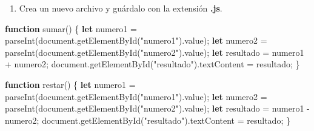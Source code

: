 \documentclass[
  a4paper,
  DIV=11,
  numbers=noendperiod,
  onepage,
  openany]{scrreprt}
\newenvironment{Shaded}{\begin{snugshade}}{\end{snugshade}}
\newcommand{\AttributeTok}[1]{\textcolor[rgb]{0.40,0.45,0.13}{#1}}
\newcommand{\BuiltInTok}[1]{\textcolor[rgb]{0.00,0.23,0.31}{#1}}
\newcommand{\FunctionTok}[1]{\textcolor[rgb]{0.28,0.35,0.67}{#1}}
\newcommand{\KeywordTok}[1]{\textcolor[rgb]{0.00,0.23,0.31}{\textbf{#1}}}
\newcommand{\NormalTok}[1]{\textcolor[rgb]{0.00,0.23,0.31}{#1}}
\newcommand{\OperatorTok}[1]{\textcolor[rgb]{0.37,0.37,0.37}{#1}}
\newcommand{\PreprocessorTok}[1]{\textcolor[rgb]{0.68,0.00,0.00}{#1}}
\newcommand{\StringTok}[1]{\textcolor[rgb]{0.13,0.47,0.30}{#1}}
\providecommand{\tightlist}{%
  \setlength{\itemsep}{0pt}\setlength{\parskip}{0pt}}\usepackage{longtable,booktabs,array}
\begin{document}
\begin{tcolorbox}
\begin{enumerate}
\def\labelenumi{\arabic{enumi}.}
\setcounter{enumi}{3}
\tightlist
\item
  Crea un nuevo archivo y guárdalo con la extensión \textbf{.js}.
\end{enumerate}

\begin{Shaded}
\begin{Highlighting}[]
\KeywordTok{function} \FunctionTok{sumar}\NormalTok{() \{}
    \KeywordTok{let}\NormalTok{ numero1 }\OperatorTok{=} \PreprocessorTok{parseInt}\NormalTok{(}\BuiltInTok{document}\OperatorTok{.}\FunctionTok{getElementById}\NormalTok{(}\StringTok{"numero1"}\NormalTok{)}\OperatorTok{.}\AttributeTok{value}\NormalTok{)}\OperatorTok{;}
    \KeywordTok{let}\NormalTok{ numero2 }\OperatorTok{=} \PreprocessorTok{parseInt}\NormalTok{(}\BuiltInTok{document}\OperatorTok{.}\FunctionTok{getElementById}\NormalTok{(}\StringTok{"numero2"}\NormalTok{)}\OperatorTok{.}\AttributeTok{value}\NormalTok{)}\OperatorTok{;}
    \KeywordTok{let}\NormalTok{ resultado }\OperatorTok{=}\NormalTok{ numero1 }\OperatorTok{+}\NormalTok{ numero2}\OperatorTok{;}
    \BuiltInTok{document}\OperatorTok{.}\FunctionTok{getElementById}\NormalTok{(}\StringTok{"resultado"}\NormalTok{)}\OperatorTok{.}\AttributeTok{textContent} \OperatorTok{=}\NormalTok{ resultado}\OperatorTok{;}
\NormalTok{\}}

\KeywordTok{function} \FunctionTok{restar}\NormalTok{() \{}
    \KeywordTok{let}\NormalTok{ numero1 }\OperatorTok{=} \PreprocessorTok{parseInt}\NormalTok{(}\BuiltInTok{document}\OperatorTok{.}\FunctionTok{getElementById}\NormalTok{(}\StringTok{"numero1"}\NormalTok{)}\OperatorTok{.}\AttributeTok{value}\NormalTok{)}\OperatorTok{;}
    \KeywordTok{let}\NormalTok{ numero2 }\OperatorTok{=} \PreprocessorTok{parseInt}\NormalTok{(}\BuiltInTok{document}\OperatorTok{.}\FunctionTok{getElementById}\NormalTok{(}\StringTok{"numero2"}\NormalTok{)}\OperatorTok{.}\AttributeTok{value}\NormalTok{)}\OperatorTok{;}
    \KeywordTok{let}\NormalTok{ resultado }\OperatorTok{=}\NormalTok{ numero1 }\OperatorTok{{-}}\NormalTok{ numero2}\OperatorTok{;}
    \BuiltInTok{document}\OperatorTok{.}\FunctionTok{getElementById}\NormalTok{(}\StringTok{"resultado"}\NormalTok{)}\OperatorTok{.}\AttributeTok{textContent} \OperatorTok{=}\NormalTok{ resultado}\OperatorTok{;}
\NormalTok{\}}


\end{Highlighting}
\end{Shaded}
\end{tcolorbox}
\end{document}
